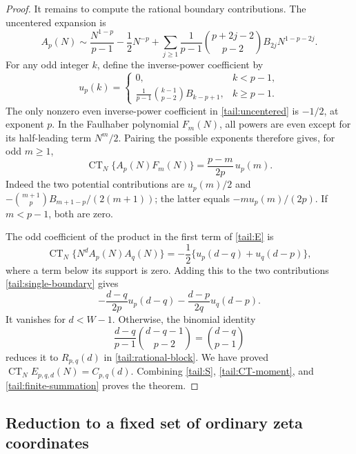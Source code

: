 \documentclass[11pt,a4paper]{article}
\numberwithin{equation}{section}
\theoremstyle{definition}
\theoremstyle{remark}
\begin{document}
\begin{proof}
It remains to compute the rational boundary contributions. The
uncentered expansion is
\begin{equation}\label{tail:uncentered}
 A_p(N)\sim\frac{N^{1-p}}{p-1}-\frac12N^{-p}
 +\sum_{j\ge1}\frac1{p-1}
       \binom{p+2j-2}{p-2}B_{2j}N^{1-p-2j}.
\end{equation}
For any odd integer \(k\), define the inverse-power coefficient by
\[
 u_p(k)=
 \begin{cases}
 0,&k<p-1,\\[2pt]
 \displaystyle\frac1{p-1}\binom{k-1}{p-2}B_{k-p+1},&k\ge p-1.
 \end{cases}
\]
The only nonzero even inverse-power coefficient in
\eqref{tail:uncentered} is \(-1/2\), at exponent \(p\).
In the Faulhaber polynomial \(F_m(N)\), all powers are even
except for its half-leading term \(N^m/2\). Pairing the possible
exponents therefore gives, for odd \(m\ge1\),
\begin{equation}\label{tail:single-boundary}
 \operatorname{CT}_N\{A_p(N)F_m(N)\}
       =\frac{p-m}{2p}\,u_p(m).
\end{equation}
Indeed the two potential contributions are
\(u_p(m)/2\) and
\(-\binom{m+1}{p}B_{m+1-p}/(2(m+1))\); the latter equals
\(-m u_p(m)/(2p)\). If \(m<p-1\), both are zero.

The odd coefficient of the product in the first term of
\eqref{tail:E} is
\[
 \operatorname{CT}_N\{N^dA_p(N)A_q(N)\}
      =-\frac12\{u_p(d-q)+u_q(d-p)\},
\]
where a term below its support is zero. Adding this to the two
contributions \eqref{tail:single-boundary} gives
\[
 -\frac{d-q}{2p}u_p(d-q)
 -\frac{d-p}{2q}u_q(d-p).
\]
It vanishes for \(d<W-1\). Otherwise, the binomial identity
\[
 \frac{d-q}{p-1}\binom{d-q-1}{p-2}
          =\binom{d-q}{p-1}
\]
reduces it to \(R_{p,q}(d)\) in \eqref{tail:rational-block}.
We have proved \(\operatorname{CT}_NE_{p,q,d}(N)=C_{p,q}(d)\).
Combining \eqref{tail:S}, \eqref{tail:CT-moment}, and
\eqref{tail:finite-summation} proves the theorem.
\end{proof}

\subsection{Reduction to a fixed set of ordinary zeta coordinates}
\end{document}
